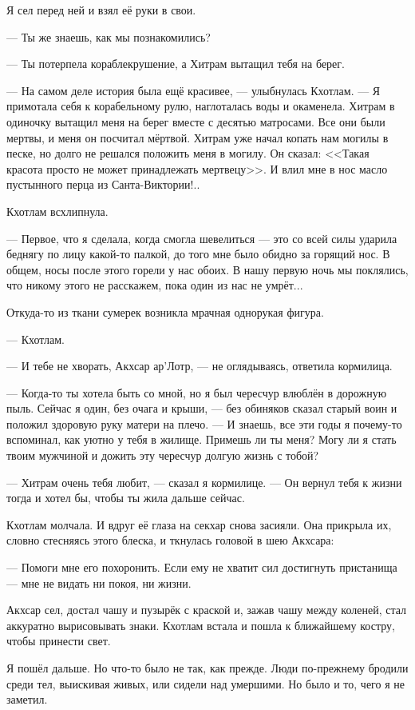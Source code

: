 Я сел перед ней и взял её руки в свои.

--- Ты же знаешь, как мы познакомились?

--- Ты потерпела кораблекрушение, а Хитрам вытащил тебя на берег.

--- На самом деле история была ещё красивее, --- улыбнулась Кхотлам.
--- Я примотала себя к корабельному рулю, наглоталась воды и окаменела.
Хитрам в одиночку вытащил меня на берег вместе с десятью матросами.
Все они были мертвы, и меня он посчитал мёртвой.
Хитрам уже начал копать нам могилы в песке, но долго не решался положить меня в могилу.
Он сказал: <<Такая красота просто не может принадлежать мертвецу>>.
И влил мне в нос масло пустынного перца из Санта-Виктории!..

Кхотлам всхлипнула.

--- Первое, что я сделала, когда смогла шевелиться --- это со всей силы ударила беднягу по лицу какой-то палкой, до того мне было обидно за горящий нос.
В общем, носы после этого горели у нас обоих.
В нашу первую ночь мы поклялись, что никому этого не расскажем, пока один из нас не умрёт...

Откуда-то из ткани сумерек возникла мрачная однорукая фигура.

--- Кхотлам.

--- И тебе не хворать, Акхсар ар’Лотр, --- не оглядываясь, ответила кормилица.

--- Когда-то ты хотела быть со мной, но я был чересчур влюблён в дорожную пыль.
Сейчас я один, без очага и крыши, --- без обиняков сказал старый воин и положил здоровую руку матери на плечо.
--- И знаешь, все эти годы я почему-то вспоминал, как уютно у тебя в жилище.
Примешь ли ты меня?
Могу ли я стать твоим мужчиной и дожить эту чересчур долгую жизнь с тобой?

--- Хитрам очень тебя любит, --- сказал я кормилице.
--- Он вернул тебя к жизни тогда и хотел бы, чтобы ты жила дальше сейчас.

Кхотлам молчала.
И вдруг её глаза на секхар снова засияли.
Она прикрыла их, словно стесняясь этого блеска, и ткнулась головой в шею Акхсара:

--- Помоги мне его похоронить.
Если ему не хватит сил достигнуть пристанища --- мне не видать ни покоя, ни жизни.

Акхсар сел, достал чашу и пузырёк с краской и, зажав чашу между коленей, стал аккуратно вырисовывать знаки.
Кхотлам встала и пошла к ближайшему костру, чтобы принести свет.

Я пошёл дальше.
Но что-то было не так, как прежде.
Люди по-прежнему бродили среди тел, выискивая живых, или сидели над умершими.
Но было и то, чего я не заметил.

